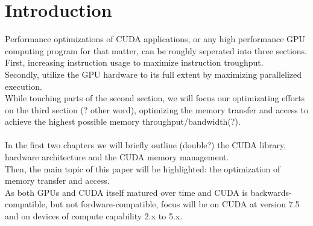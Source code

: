\section{Introduction}
\label{sec:intro}
Performance optimizations of CUDA applications, or any high performance GPU computing program for that matter, can be roughly seperated into three sections.\\
First, increasing instruction usage to maximize instruction troughput.\\
Secondly, utilize the GPU hardware to its full extent by maximizing parallelized execution.\\
While touching parts of the second section, we will focus our optimizating efforts on the third section (? other word), 
optimizing the memory transfer and access to achieve the highest possible memory throughput/bandwidth(?).\\
\\
In the first two chapters we will briefly outline (double?) the CUDA library, hardware architecture and the CUDA memory management.\\
Then, the main topic of this paper will be highlighted: the optimization of memory transfer and access.\\
As both GPUs and CUDA itself matured over time and CUDA is backwards-compatible, but not fordware-compatible,
focus will be on CUDA at version 7.5 and on devices of compute capability 2.x to 5.x.\\
